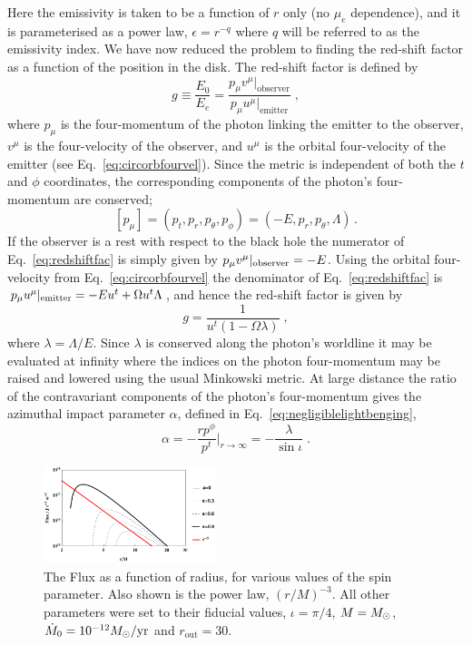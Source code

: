 Here the emissivity is taken to be a function of $r$ only (no $\mu_{e}$ dependence), and it is parameterised as a power law, $\epsilon=r^{-q}$ where $q$ will be referred to as the emissivity index. We have now reduced the problem to finding the red-shift factor as a function of the position in the disk. The red-shift factor is defined by
\begin{equation} g \equiv \frac{E_{0}}{E_{e}} = \frac{p_{\mu}v^{\mu}\big|_{\textrm{observer}}}{p_{\mu}u^{\mu}\big|_{\textrm{emitter}}} \; ,\end{equation}
where $p_{\mu}$ is the four-momentum of the photon linking the emitter to the observer, $v^{\mu}$ is the four-velocity of the observer, and $u^{\mu}$ is the orbital four-velocity of the emitter (see Eq.\ \ref{eq:circorbfourvel}). Since the metric is independent of both the $t$ and $\phi$ coordinates, the corresponding components of the photon's four-momentum are conserved;
\begin{equation} \left[ p_{\mu} \right] = (p_{t},p_{r},p_{\theta},p_{\phi}) = (-E,p_{r},p_{\theta},\Lambda) \, .\end{equation}
If the observer is a rest with respect to the black hole the numerator of Eq.\ \ref{eq:redshiftfac} is simply given by ${p_{\mu}v^{\mu}\small|_{\textrm{observer}}=-E}$. Using the orbital four-velocity from Eq.\ \ref{eq:circorbfourvel} the denominator of Eq.\ \ref{eq:redshiftfac} is ${p_{\mu}u^{\mu}\small|_{\textrm{emitter}}=-Eu^{t}+\Omega u^{t} \Lambda}$, and hence the red-shift factor is given by
\begin{equation}\label{eq:redshiftfac} g=  \frac{1}{u^{t}(1-\Omega \lambda)} \; ,\end{equation}
where $\lambda = \Lambda /E$. Since $\lambda$ is conserved along the photon's worldline it may be evaluated at infinity where the indices on the photon four-momentum may be raised and lowered using the usual Minkowski metric. At large distance the ratio of the contravariant components of the photon's four-momentum gives the azimuthal impact parameter $\alpha$, defined in Eq.\ \ref{eq:negligiblelightbenging},
\begin{equation} \alpha = -\frac{r p^{\phi}}{p^{t}} \Big|_{r\rightarrow \infty} =-\frac{\lambda}{\sin\iota}\; .\end{equation}

\begin{figure}[h]
 \centering
 \includegraphics[trim=0cm 0cm 0cm 0cm, width=0.45\textwidth]{KerrFlux.pdf}
 \caption{The Flux as a function of radius, for various values of the spin parameter. Also shown is the power law, $(r/M)^{-3}$. All other parameters were set to their fiducial values, $\iota=\pi/4$, $M=M_{ \odot }$, $\dot{M}_{0}=10^{-12}M_{ \odot }/\textrm{yr}$ and $r_{\textrm{out}}=30$.}
 \label{fig:KerrFlux}
\end{figure}

